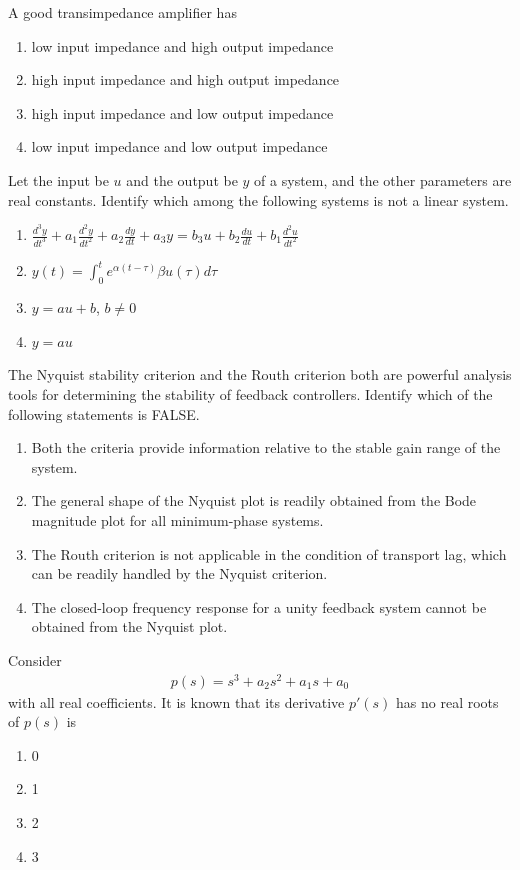 \item A good transimpedance amplifier has
\begin{enumerate}
\item low input impedance and high output impedance
\item high input impedance and high output impedance
\item high input impedance and low output impedance
\item low input impedance and low output impedance
\end{enumerate}

\item Let the input be $u$ and the output be $y$ of a system, and the other parameters are real constants. Identify which among the following systems is not a linear system.
\begin{enumerate}
\item $\frac{d^3y}{dt^3} + a_1\frac{d^2y}{dt^2} + a_2\frac{dy}{dt} + a_3y = b_3u + b_2\frac{du}{dt} + b_1\frac{d^2u}{dt^2}$
\item $y(t) = \int_{0}^{t}e^{\alpha(t - \tau)}\beta u(\tau)d\tau$
\item $y = au + b$, $b \neq 0$
\item $y = au$
\end{enumerate}

\item The Nyquist stability criterion and the Routh criterion both are powerful analysis tools for determining the stability of feedback controllers. Identify which of the following statements is FALSE.
\begin{enumerate}
\item Both the criteria provide information relative to the stable gain range of the system.
\item The general shape of the Nyquist plot is readily obtained from the Bode magnitude plot for all minimum-phase systems.
\item The Routh criterion is not applicable in the condition of transport lag, which can be readily handled by the Nyquist criterion.
\item The closed-loop frequency response for a unity feedback system cannot be obtained from the Nyquist plot.
\end{enumerate}

\item Consider 
\begin{align*}
p(s) = s^3 + a_2s^2 + a_1s + a_0
\end{align*}
with all real coefficients. It is known that its derivative $p'(s)$ has no real roots of $p(s)$ is
\begin{enumerate}
\item 0
\item 1
\item 2
\item 3
\end{enumerate}

